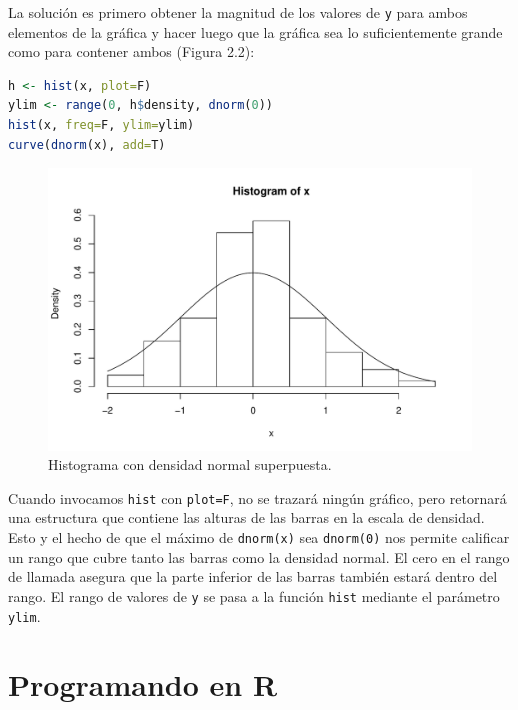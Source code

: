 La solución es primero obtener la magnitud de los valores de \texttt{y} para ambos
elementos de la gráfica y hacer luego  que la gráfica sea lo suficientemente grande
como para contener ambos (Figura 2.2):

\begin{lstlisting}[language=R]
h <- hist(x, plot=F)
ylim <- range(0, h$density, dnorm(0))
hist(x, freq=F, ylim=ylim)
curve(dnorm(x), add=T)
\end{lstlisting}

\begin{figure}[H]
  \includegraphics[width=\linewidth]{img/fig-6.pdf}
  \caption{Histograma con densidad normal superpuesta.}
  \label{fig:fig-6}
\end{figure}


Cuando invocamos \texttt{hist} con \texttt{plot=F}, no se trazará ningún
gráfico, pero retornará una estructura que contiene las alturas de las barras en
la escala de densidad. Esto y el hecho de que el máximo de \texttt{dnorm(x)} sea
\texttt{dnorm(0)} nos permite calificar un rango que cubre tanto las barras como
la densidad normal. El cero en el rango de llamada asegura que la parte inferior
de las barras también estará dentro del rango.  El rango de valores de
\texttt{y} se pasa a la función \texttt{hist} mediante el parámetro
\texttt{ylim}.

\section{Programando en \textbf{R}}

